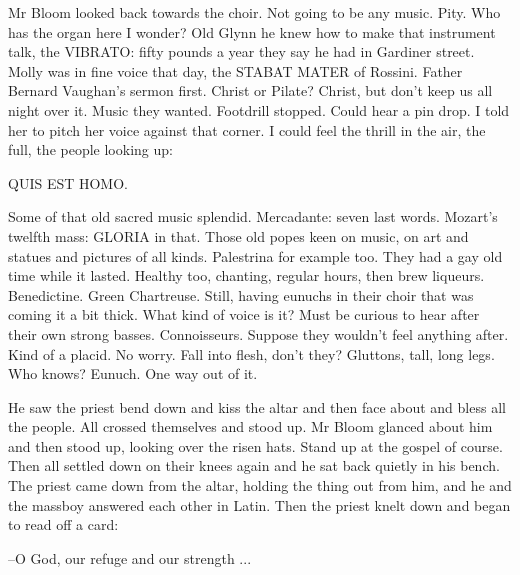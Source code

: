 Mr Bloom looked back towards the choir. Not going to be any music.
Pity. Who has the organ here I wonder? Old Glynn he knew how to make
that instrument talk, the VIBRATO: fifty pounds a year they say he had in
Gardiner street. Molly was in fine voice that day, the STABAT MATER of
Rossini. Father Bernard Vaughan's sermon first. Christ or Pilate? Christ,
but don't keep us all night over it. Music they wanted. Footdrill stopped.
Could hear a pin drop. I told her to pitch her voice against that corner.
I could feel the thrill in the air, the full, the people looking up:

QUIS EST HOMO.

Some of that old sacred music splendid. Mercadante: seven last
words. Mozart's twelfth mass: GLORIA in that. Those old popes keen on
music, on art and statues and pictures of all kinds. Palestrina for
example too. They had a gay old time while it lasted. Healthy too,
chanting, regular hours, then brew liqueurs. Benedictine. Green
Chartreuse. Still, having eunuchs in their choir that was coming it a bit
thick. What kind of voice is it? Must be curious to hear after their own
strong basses. Connoisseurs. Suppose they wouldn't feel anything after.
Kind of a placid. No worry. Fall into flesh, don't they? Gluttons, tall,
long legs. Who knows? Eunuch. One way out of it.

He saw the priest bend down and kiss the altar and then face about
and bless all the people. All crossed themselves and stood up. Mr Bloom
glanced about him and then stood up, looking over the risen hats. Stand up
at the gospel of course. Then all settled down on their knees again and he
sat back quietly in his bench. The priest came down from the altar,
holding the thing out from him, and he and the massboy answered each other
in Latin. Then the priest knelt down and began to read off a card:

--O God, our refuge and our strength ...

